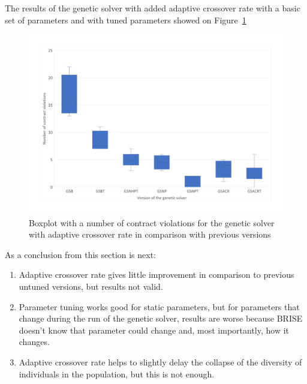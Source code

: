 The results of the genetic solver with added adaptive crossover rate with a basic set of parameters and with tuned parameters showed on Figure~\ref{fig:boxplotsolverAdaptiveCrossoverTuning}

\begin{figure}
	\centering
	\includegraphics[width=\textwidth]{images/BoxPlotSolverAdaptiveCrossoverTuning.pdf}
	\caption[Boxplot with a number of contract violations for the genetic solver with adaptive crossover rate in comparison with previous versions]{Boxplot with a number of contract violations for the genetic solver with adaptive crossover rate in comparison with previous versions}
	\label{fig:boxplotsolverAdaptiveCrossoverTuning}
\end{figure}

As a conclusion from this section is next:

\begin{enumerate}
	\item Adaptive crossover rate gives little improvement in comparison to previous untuned versions, but results not valid.
	\item Parameter tuning works good for static parameters, but for parameters that change during the run of the genetic solver, results are worse because BRISE doesn't know that parameter could change and, most importantly, how it changes.
	\item Adaptive crossover rate helps to slightly delay the collapse of the diversity of individuals in the population, but this is not enough.
\end{enumerate} 

